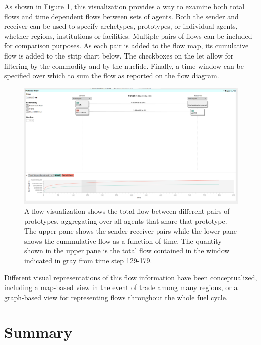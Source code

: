 As shown in Figure \ref{fig:flow-01-05}, this visualization provides a way to
examine both total flows and time dependent flows between sets of agents.
Both the sender and receiver can be used to specify archetypes, prototypes, or
individual agents, whether regions, institutions or facilities.  Multiple
pairs of flows can be included for comparison purposes.  As each pair is added
to the flow map, its cumulative flow is added to the strip chart below.  The
checkboxes on the let allow for filtering by the commodity and by the nuclide.
Finally, a time window can be specified over which to sum the flow as reported
on the flow diagram.

\begin{figure}[htbp]
\begin{center}
\includegraphics[width=\columnwidth]{./images/flow-01-05}
\caption{A flow visualization shows the total flow between different pairs of
  prototypes, aggregating over all agents that share that prototype.  The
  upper pane shows the sender receiver pairs while the lower pane shows the
  cummulative flow as a function of time.  The quantity shown in the upper
  pane is the total flow contained in the window indicated in gray from time
  step 129-179. }
\end{center}
\label{fig:flow-01-05}
\end{figure}

Different visual representations of this flow information have been
conceptualized, including a map-based view in the event of trade among many
regions, or a graph-based view for representing flows throughout the whole
fuel cycle.

\section{Summary}


